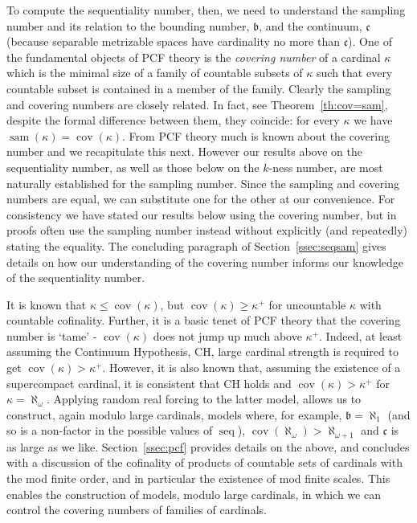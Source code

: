 \documentclass{article}
\begin{document}
To compute the sequentiality number, then, we need to understand the sampling number and its relation to the bounding number, $\mathfrak{b}$, and the continuum, $\mathfrak{c}$ (because separable metrizable spaces have cardinality no more than $\mathfrak{c}$).  
One of the fundamental objects of \textsc{PCF} theory is the \emph{covering number} of a cardinal $\kappa$ which is the minimal size of a family  of countable subsets of $\kappa$ such that every countable subset is contained in a member of the family. 
Clearly the sampling and covering numbers are closely related. In fact, see Theorem~\ref{th:cov=sam}, despite the formal difference between them, they coincide: for every $\kappa$ we have $\mathop{sam}(\kappa)=\mathop{cov}(\kappa)$. 
From \textsc{PCF} theory much is known about the covering number and we recapitulate this next. However 
our results above on the sequentiality number, as well as those below on the $k$-ness number, are most naturally established for the sampling number. 
Since the sampling and covering numbers are equal, we can substitute one for the other at our convenience. 
For consistency we have stated our results below using the covering number, but in proofs often use the sampling number instead without explicitly (and repeatedly) stating the equality.  The concluding paragraph of Section~\ref{ssec:seqsam} gives details on how our understanding of the covering number informs our knowledge of the sequentiality number.

It is known that $\kappa \le \mathop{cov}(\kappa)$, but $\mathop{cov}(\kappa) \ge \kappa^+$ for uncountable $\kappa$ with countable cofinality. Further, it is a basic tenet of \textsc{PCF} theory that the covering number is `tame' - $\mathop{cov}(\kappa)$ does not jump up much above $\kappa^+$. 
Indeed, at least assuming the Continuum Hypothesis, \textsc{CH},  large cardinal strength is required  to get $\mathop{cov}(\kappa) > \kappa^+$. However, it is also known that, assuming the existence of a supercompact cardinal, it is consistent that \textsc{CH} holds and  $\mathop{cov}(\kappa) > \kappa^+$ for $\kappa=\aleph_\omega$. 
Applying random real forcing to the latter model,  allows us to construct, again modulo large cardinals, models where, for example,  $\mathfrak{b}=\aleph_1$ (and so is a non-factor in the possible values of $\mathop{seq}$), $\mathop{cov}(\aleph_\omega)>\aleph_{\omega+1}$ and $\mathfrak{c}$ is as large as we like. Section~\ref{ssec:pcf} provides  details on the above, and concludes with a discussion of the cofinality of products of countable sets of cardinals with the mod finite order, and in particular the existence of mod finite scales. 
This enables the construction of models, modulo large cardinals, in which we can control the covering numbers of families of cardinals. 
\end{document}
